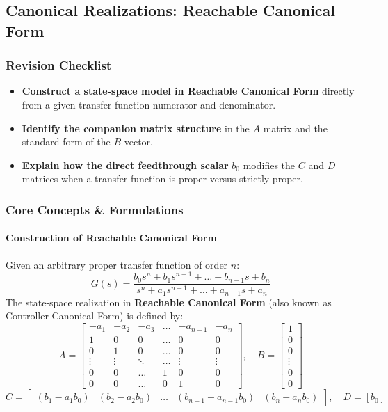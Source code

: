 \documentclass[12pt,onecolumn,twoside ]{article}
\begin{document}
	\subsection{Canonical Realizations: Reachable Canonical Form}
	\subsubsection{Revision Checklist}
	\begin{itemize}
		\item[$\square$]
		\textbf{Construct a state-space model in Reachable Canonical Form} directly from a given transfer function numerator and denominator.
		\item[$\square$]
		\textbf{Identify the companion matrix structure} in the $A$ matrix and the standard form of the $B$ vector.
		\item[$\square$]
		\textbf{Explain how the direct feedthrough scalar} $b_0$ modifies the $C$ and $D$ matrices when a transfer function is proper versus strictly proper.
	\end{itemize}
	
	\subsubsection{Core Concepts \& Formulations}
	\paragraph{Construction of Reachable Canonical Form}
	Given an arbitrary proper transfer function of order $n$: \[
	G(s) = \frac{b_0 s^n + b_1 s^{n-1} + \dots + b_{n-1}s + b_n}{s^n + a_1 s^{n-1} + \dots + a_{n-1}s + a_n}
	\]
	The state-space realization in \textbf{Reachable Canonical Form} (also known as Controller Canonical Form) is defined by:
	\[
	A = \begin{bmatrix} 
		-a_1 & -a_2 & -a_3 & \dots & -a_{n-1} & -a_n \\ 
		1 & 0 & 0 & \dots & 0 & 0 \\ 
		0 & 1 & 0 & \dots & 0 & 0 \\ 
		\vdots & \vdots & \ddots & \dots & \vdots & \vdots \\ 
		0 & 0 & \dots & 1 & 0 & 0 \\ 
		0 & 0 & \dots & 0 & 1 & 0 
	\end{bmatrix}, \quad 
	B = \begin{bmatrix} 
		1 \\ 0 \\ 0 \\ \vdots \\ 0 \\ 0 
	\end{bmatrix}
	\]
	\[
	C = \begin{bmatrix} (b_1 - a_1 b_0) & (b_2 - a_2 b_0) & \dots & (b_{n-1} - a_{n-1} b_0) & (b_n - a_n b_0) \end{bmatrix}, \quad D = [b_0]
	\]
\end{document}
